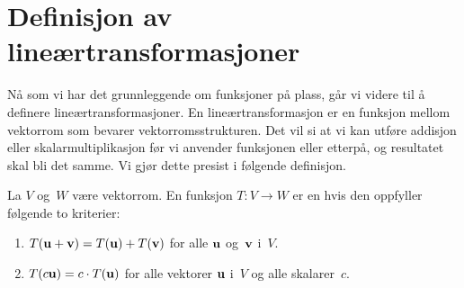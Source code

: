 

\section*{Definisjon av lineærtransformasjoner}

Nå som vi har det grunnleggende om funksjoner på plass, går vi videre
til å definere lineærtransformasjoner.  En lineærtransformasjon er en
funksjon mellom vektorrom som bevarer vektorromsstrukturen.  Det vil
si at vi kan utføre addisjon eller skalarmultiplikasjon før vi
anvender funksjonen eller etterpå, og resultatet skal bli det samme.
Vi gjør dette presist i følgende definisjon.

\begin{defn}
La $V$ og~$W$ være vektorrom.  En funksjon $T \colon V \to W$ er en
 hvis den oppfyller følgende to
kriterier:
\begin{enumerate}
\item $T(\mathbf{u} + \mathbf{v}) = T(\mathbf{u}) + T(\mathbf{v})$
      for alle $\mathbf{u}$ og~$\mathbf{v}$ i~$V$.
\item $T(c \mathbf{u}) = c \cdot T(\mathbf{u})$
      for alle vektorer $\mathbf{u}$ i~$V$ og alle skalarer~$c$.
\qedhere
\end{enumerate}
\end{defn}

